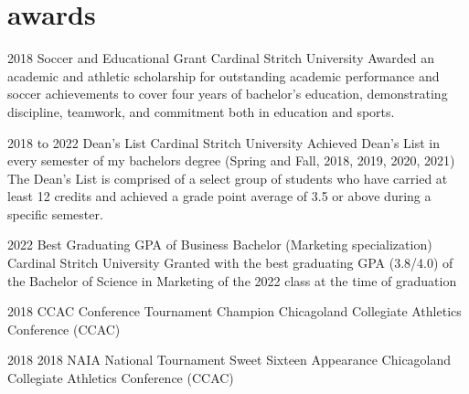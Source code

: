 \documentclass[]{friggeri-cv-a4}
\begin{document}

\section{awards}

\begin{entrylist}


\entry
{2018}
{Soccer and Educational Grant}
{Cardinal Stritch University}
{Awarded an academic and athletic scholarship for outstanding academic performance and soccer achievements to cover four years of bachelor's education, demonstrating discipline, teamwork, and commitment both in education and sports.}


\entry
{2018 to 2022}
{Dean's List}
{Cardinal Stritch University}
{Achieved Dean's List in every semester of my bachelors degree (Spring and Fall, 2018, 2019, 2020, 2021)
The Dean's List is comprised of a select group of students who have carried at least 12 credits and achieved a grade point average of
3.5 or above during a specific semester.}


\entry
{2022}
{Best Graduating GPA of Business Bachelor (Marketing specialization)}
{Cardinal Stritch University}
{Granted with the best graduating GPA (3.8/4.0) of the Bachelor of Science in Marketing of the 2022 class at the time of graduation}


\entry
{2018}
{CCAC Conference Tournament Champion}
{Chicagoland Collegiate Athletics Conference (CCAC)}


\entry
{2018}
{2018 NAIA National Tournament Sweet Sixteen Appearance}
{Chicagoland Collegiate Athletics Conference (CCAC)}



\end{entrylist}

\end{document}
